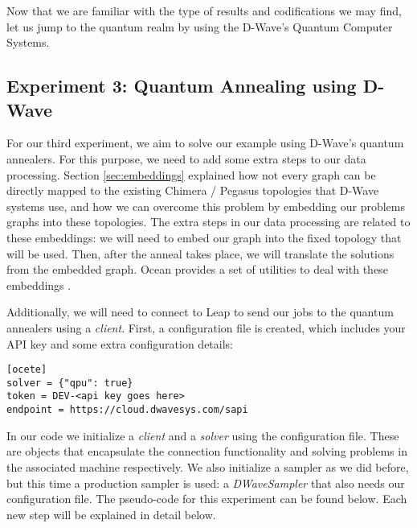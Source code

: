 Now that we are familiar with the type of results and codifications we may find, let us jump to the quantum realm by using the D-Wave's Quantum Computer Systems.


\subsection{Experiment 3: Quantum Annealing using D-Wave}


For our third experiment, we aim to solve our example using D-Wave's quantum annealers. For this purpose, we need to add some extra steps to our data processing. Section \ref{sec:embeddings} explained how not every graph can be directly mapped to the existing Chimera / Pegasus topologies that D-Wave systems use, and how we can overcome this problem by embedding our problems graphs into these topologies. The extra steps in our data processing are related to these embeddings: we will need to embed our graph into the fixed topology that will be used. Then, after the anneal takes place, we will translate the solutions from the embedded graph. Ocean provides a set of utilities to deal with these embeddings \cite{DWave-OceanDoc-Embedding}.

Additionally, we will need to connect to Leap to send our jobs to the quantum annealers using a \emph{client}. First, a configuration file is created, which includes your API key and some extra configuration details:

\begin{verbatim}
[ocete]
solver = {"qpu": true}
token = DEV-<api key goes here>
endpoint = https://cloud.dwavesys.com/sapi
\end{verbatim}

In our code we initialize a \emph{client} and a \emph{solver} using the configuration file. These are objects that encapsulate the connection functionality and solving problems in the associated machine respectively. We also initialize a sampler as we did before, but this time a production sampler is used: a \emph{DWaveSampler} that also needs our configuration file. The pseudo-code for this experiment can be found below. Each new step will be explained in detail below.

